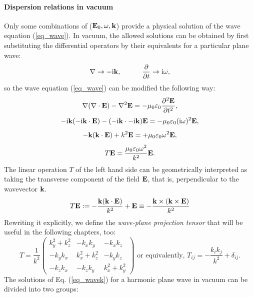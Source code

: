 \paragraph{Dispersion relations in vacuum} %
Only some combinations of ($\mathbf{E}_0, \omega, {\mathbf{k}}$) provide a physical solution of the wave equation (\ref{eq_wave}). In vacuum, the allowed solutions can be obtained by first substituting the differential operators by their equivalents for a particular plane wave:
\begin{equation} \nabla \rightarrow -{\mathrm i}{\mathbf{k}}, \quad\quad\quad 
\frac{\partial} {\partial t} \rightarrow {\mathrm i}\omega, \label{eq_difftok}\end{equation}
so the wave equation (\ref{eq_wave}) can be modified the following way:
$$					\nabla (\nabla \cdot \mathbf{E}) - \nabla^2 \mathbf{E}				  =	-\mu_0 \varepsilon_0 \frac{\partial^{2} \mathbf{E}}{\partial t^{2}},  $$
$$				 -{\mathrm i}{\mathbf{k}} (-{\mathrm i}{\mathbf{k}} \cdot \mathbf{E})  - (-{\mathrm i}{\mathbf{k}} \cdot -{\mathrm i}{\mathbf{k}}) \mathbf{E} = -\mu_0 \varepsilon_0 ({\mathrm i}\omega)^2 \mathbf{E}, $$
$$   - {\mathbf{k}} ({\mathbf{k}} \cdot \mathbf{E})      +          k^2 \mathbf{E}            = +\mu_0 \varepsilon_0 \omega^{2} \mathbf{E},  $$
\begin{equation}  T\mathbf{E}            = \frac{\mu_0 \varepsilon_0 \omega^{2}}{k^2} \mathbf{E}.  \label{eq_wavek}\end{equation}
The linear operation $T$ of the left hand side can be geometrically interpreted as taking the transverse component of the field $\mathbf{E}$, that is, perpendicular to the wavevector ${\mathbf{k}}$. 
\begin{equation} T\mathbf{E} :=  -\frac{{\mathbf{k}} ({\mathbf{k}} \cdot \mathbf{E})}{k^2} + \mathbf{E}     \equiv     - \frac{{\mathbf{k}}\times({\mathbf{k}}\times\mathbf{E})}{k^2} \label{eq_transverse1}\end{equation}
Rewriting it explicitly, we define the \textit{wave-plane projection tensor} that will be useful in the following chapters, too:
\begin{equation} T = \frac{1}{k^2} 
\left(\begin{array}{ccc} 
	k_y^2+k_z^2  	& -k_x k_y 		& -k_x k_z \\ 
	-k_y k_x 		& k_x^2+k_z^2	& -k_y k_z \\ 
	-k_z k_x 		& -k_z k_y		& k_x^2+k_y^2
	\end{array} \right) 
\text{ or equivalently, }
T_{ij} = - \frac{k_i k_j}{k^2} + \delta_{ij} .  \label{eq_transverse2}\end{equation}
The solutions of Eq. (\ref{eq_wavek}) for a harmonic plane wave in vacuum can be divided into two groups: %
